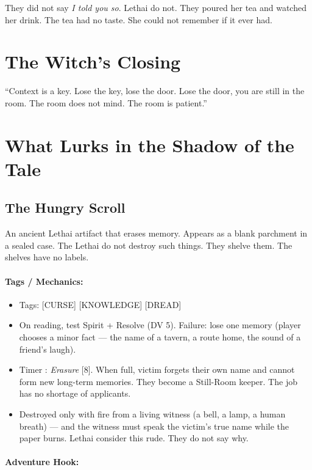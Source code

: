 They did not say \emph{I told you so}. Lethai do not. They poured her tea and watched her drink. The tea had no taste. She could not remember if it ever had.

\section*{The Witch's Closing}

``Context is a key. Lose the key, lose the door. Lose the door, you are still in the room. The room does not mind. The room is patient.''

\section*{What Lurks in the Shadow of the Tale}

\subsection*{The Hungry Scroll}

An ancient Lethai artifact that erases memory. Appears as a blank parchment in a sealed case. The Lethai do not destroy such things. They shelve them. The shelves have no labels.

\paragraph{Tags / Mechanics:}

\begin{itemize}
\item Tags: [CURSE] [KNOWLEDGE] [DREAD]
\item On reading, test Spirit + Resolve (DV 5). Failure: lose one memory (player chooses a minor fact --- the name of a tavern, a route home, the sound of a friend's laugh).
\item Timer : \textit{Erasure} [8]. When full, victim forgets their own name and cannot form new long-term memories. They become a Still-Room keeper. The job has no shortage of applicants.
\item Destroyed only with fire from a living witness (a bell, a lamp, a human breath) --- and the witness must speak the victim's true name while the paper burns. Lethai consider this rude. They do not say why.
\end{itemize}

\paragraph{Adventure Hook:}

